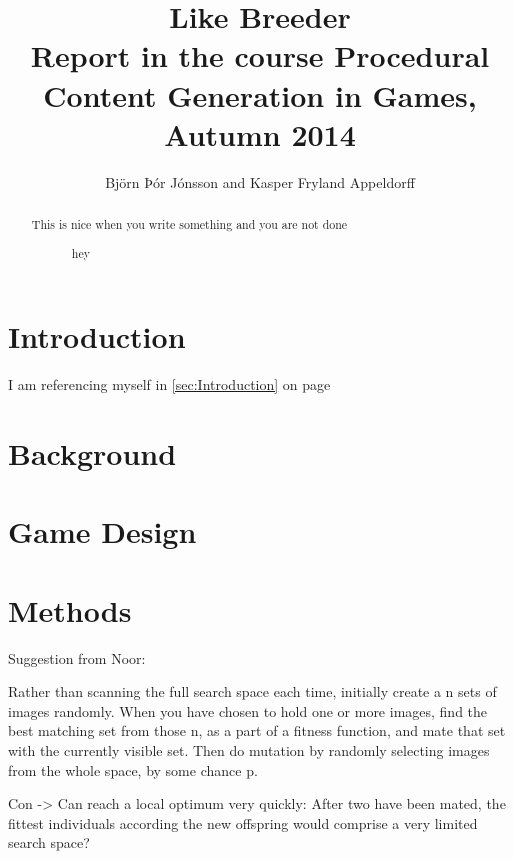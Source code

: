 \documentclass[]{article}
\title{Like Breeder\\ \small Report in the course Procedural Content Generation in Games, Autumn 2014}
\author{Björn Þór Jónsson and Kasper Fryland Appeldorff}
\begin{document}

\maketitle
\listoftodos %
\newpage
\begin{abstract}
This is nice when you write something and you are not done 
\begin{figure}[h!]
\caption{hey}
\label{fig:test}
\end{figure}
\end{abstract}

\section{Introduction}
\label{sec:Introduction}
I am referencing myself in \autoref{sec:Introduction} on page \pageref{sec:Introduction}
\section{Background}
\label{sec:Background}
\section{Game Design}
\label{sec:GameDesign}


\section{Methods}
\label{sec:Methods}

Suggestion from Noor:

Rather than scanning the full search space each time, initially create a n sets of images randomly.  When you have chosen to hold one or more images, find the best matching set from those n, as a part of a fitness function, and mate that set with the currently visible set.  Then do mutation by randomly selecting images from the whole space, by some chance p.


Con ->  Can reach a local optimum very quickly:  After two have been mated, the fittest individuals according the new offspring would comprise a very limited search space?
\end{document}
